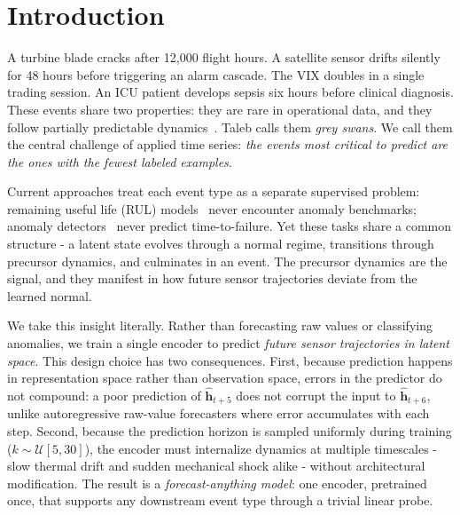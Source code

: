 \documentclass{article}
\newcommand{\h}{\mathbf{h}}
\begin{document}
\section{Introduction}
\label{sec:intro}

A turbine blade cracks after 12{,}000 flight hours. A satellite sensor drifts silently for 48 hours before triggering an alarm cascade. The VIX doubles in a single trading session. An ICU patient develops sepsis six hours before clinical diagnosis. These events share two properties: they are rare in operational data, and they follow partially predictable dynamics~\citep{taleb2007blackswan,greyswan_supplychain2025}. Taleb calls them \emph{grey swans}. We call them the central challenge of applied time series: \emph{the events most critical to predict are the ones with the fewest labeled examples}.

Current approaches treat each event type as a separate supervised problem: remaining useful life (RUL) models~\citep{fan2024star,ttsnet2025} never encounter anomaly benchmarks; anomaly detectors~\citep{xu2022anomalytransformer,yang2023dcdetector} never predict time-to-failure. Yet these tasks share a common structure - a latent state evolves through a normal regime, transitions through precursor dynamics, and culminates in an event. The precursor dynamics are the signal, and they manifest in how future sensor trajectories deviate from the learned normal.

We take this insight literally. Rather than forecasting raw values or classifying anomalies, we train a single encoder to predict \emph{future sensor trajectories in latent space}. This design choice has two consequences. First, because prediction happens in representation space rather than observation space, errors in the predictor do not compound: a poor prediction of $\hat{\h}_{t+5}$ does not corrupt the input to $\hat{\h}_{t+6}$, unlike autoregressive raw-value forecasters where error accumulates with each step. Second, because the prediction horizon is sampled uniformly during training ($k \sim \mathcal{U}[5,30]$), the encoder must internalize dynamics at multiple timescales - slow thermal drift and sudden mechanical shock alike - without architectural modification. The result is a \emph{forecast-anything model}: one encoder, pretrained once, that supports any downstream event type through a trivial linear probe.
\end{document}

